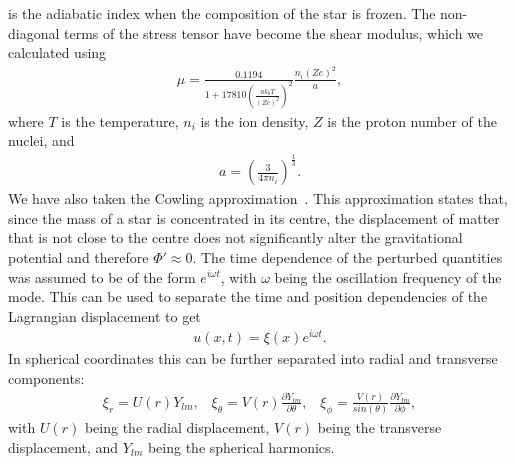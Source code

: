 \documentclass[fleqn,usenatbib]{mnras}
\begin{document}
\noindent is the adiabatic index when the composition of the star is frozen. The non-diagonal terms of the stress tensor have become the shear modulus, which we calculated using~\cite{strohmayer1991shear}
\begin{align}
\mu=\frac{0.1194}{1+17810\left(\frac{ak_bT}{\left(Ze\right)^2}\right)^2}\frac{n_i\left(Ze\right)^2}{a},
\label{eq:mu_1991}
\end{align}
\noindent where $T$ is the temperature, $n_i$ is the ion density, $Z$ is the proton number of the nuclei, and 
\begin{align}
a=\left(\frac{3}{4\pi n_i}\right)^{\frac{1}{3}}.
\label{eq:mu_1991_a}
\end{align}
\noindent We have also taken the Cowling approximation~\cite{cowling1941non}. This approximation states that, since the mass of a star is concentrated in its centre, the displacement of matter that is not close to the centre does not significantly alter the gravitational potential and therefore $\Phi '\approx 0$. The time dependence of the perturbed quantities was assumed to be of the form $e^{i\omega t}$, with $\omega$ being the oscillation frequency of the mode. This can be used to separate the time and position dependencies of the Lagrangian displacement to get
\begin{align}
u(x,t)=\xi(x)e^{i\omega t}.
\label{eq:time_seperation}
\end{align}
\noindent In spherical coordinates this can be further separated into radial and transverse components:
\begin{align}
\xi_r=U(r)Y_{lm},\;\;\;\xi_{\theta}=V(r)\frac{\partial Y_{lm}}{\partial\theta},\;\;\;\xi_{\phi}=\frac{V(r)}{sin(\theta)}\frac{\partial Y_{lm}}{\partial\phi},
\label{eq:xi_seperation}
\end{align}
\noindent with $U(r)$ being the radial displacement, $V(r)$ being the transverse displacement, and $Y_{lm}$ being the spherical harmonics.
\end{document}
